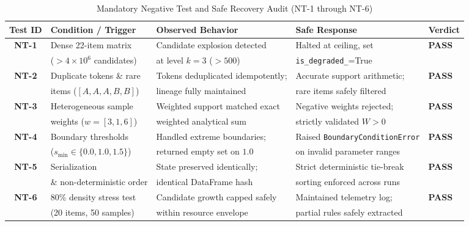 \documentclass[11pt,a4paper]{article}
\newcommand{\toprule}{\hline\hline}
\newcommand{\midrule}{\hline}
\newcommand{\bottomrule}{\hline\hline}
\begin{document}
\begin{table}[!ht]
\centering
\caption{Mandatory Negative Test and Safe Recovery Audit (NT-1 through NT-6)}
\vspace{0.2em}
\scriptsize
\begin{tabular}{cllll}
\toprule
\textbf{Test ID} & \textbf{Condition / Trigger} & \textbf{Observed Behavior} & \textbf{Safe Response} & \textbf{Verdict} \\
\midrule
\textbf{NT-1} & Dense 22-item matrix & Candidate explosion detected & Halted at ceiling, set & \textbf{PASS} \\
              & ($> 4 \times 10^6$ candidates) & at level $k=3$ ($> 500$) & \texttt{is\_degraded\_}=True & \\
\midrule
\textbf{NT-2} & Duplicate tokens \& rare & Tokens deduplicated idempotently; & Accurate support arithmetic; & \textbf{PASS} \\
              & items ($[A, A, A, B, B]$) & lineage fully maintained & rare items safely filtered & \\
\midrule
\textbf{NT-3} & Heterogeneous sample & Weighted support matched exact & Negative weights rejected; & \textbf{PASS} \\
              & weights ($w = [3, 1, 6]$) & weighted analytical sum & strictly validated $W > 0$ & \\
\midrule
\textbf{NT-4} & Boundary thresholds & Handled extreme boundaries; & Raised \texttt{BoundaryConditionError} & \textbf{PASS} \\
              & ($s_{\min} \in \{0.0, 1.0, 1.5\}$) & returned empty set on $1.0$ & on invalid parameter ranges & \\
\midrule
\textbf{NT-5} & Serialization & State preserved identically; & Strict deterministic tie-break & \textbf{PASS} \\
              & \& non-deterministic order & identical DataFrame hash & sorting enforced across runs & \\
\midrule
\textbf{NT-6} & 80\% density stress test & Candidate growth capped safely & Maintained telemetry log; & \textbf{PASS} \\
              & (20 items, 50 samples) & within resource envelope & partial rules safely extracted & \\
\bottomrule
\end{tabular}
\end{table}
\end{document}
